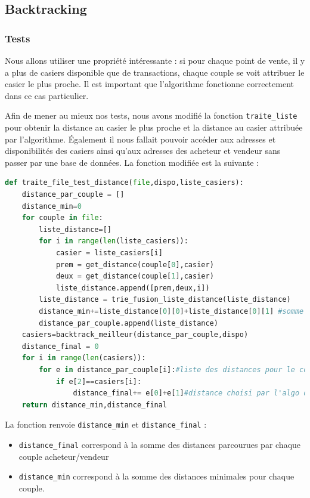 \documentclass[11pt]{article}
\begin{document}
\subsection{Backtracking}
\subsubsection{Tests}
Nous allons utiliser une propriété intéressante : si pour chaque point de vente, il y a plus de casiers disponible que de transactions, chaque couple se voit attribuer le casier le plus proche. Il est important que l'algorithme fonctionne correctement dans ce cas particulier.
\vspace{0.4cm}


Afin de mener au mieux nos tests, nous avons modifié la fonction \texttt{traite\_liste} pour obtenir la distance au casier le plus proche et la distance au casier attribuée par l'algorithme. Également il nous fallait pouvoir accéder aux adresses et disponibilités des casiers ainsi qu'aux adresses des acheteur et vendeur sans passer par une base de données. La fonction modifiée est la suivante :
\vspace{1.2cm}

\begin{lstlisting}[language=Python, caption={ Fonction \texttt{traite\_file} modifiée pour les tests }]
def traite_file_test_distance(file,dispo,liste_casiers):
    distance_par_couple = []
    distance_min=0
    for couple in file:
        liste_distance=[]
        for i in range(len(liste_casiers)):
            casier = liste_casiers[i]
            prem = get_distance(couple[0],casier)
            deux = get_distance(couple[1],casier)
            liste_distance.append([prem,deux,i])
        liste_distance = trie_fusion_liste_distance(liste_distance)
        distance_min+=liste_distance[0][0]+liste_distance[0][1] #somme des plus petites distances parcouru
        distance_par_couple.append(liste_distance)
    casiers=backtrack_meilleur(distance_par_couple,dispo)
    distance_final = 0
    for i in range(len(casiers)):
        for e in distance_par_couple[i]:#liste des distances pour le couple e
            if e[2]==casiers[i]:
                distance_final+= e[0]+e[1]#distance choisi par l'algo de backtracking
    return distance_min,distance_final
\end{lstlisting}
\vspace{0.4cm}
La fonction renvoie \texttt{distance\_min} et \texttt{distance\_final} :\begin{itemize}
    \item \texttt{distance\_final} correspond à la somme des distances parcourues par chaque couple acheteur/vendeur
    \item \texttt{distance\_min} correspond à la somme des distances minimales pour chaque couple.
\end{itemize}{}
\end{document}
